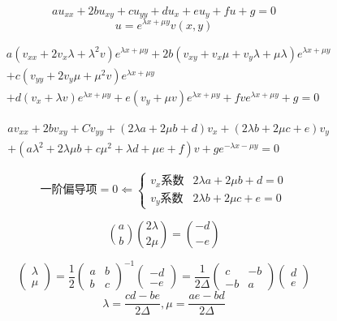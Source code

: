 \begin{ex}[常系数二阶PDE可消去一阶偏导项]

    $$au_{xx}+2bu_{xy}+cu_{yy}+du_{x}+eu_{y}+fu+g=0$$
    $$u=e^{\lambda x+\mu y}v(x,y)$$

    $$\begin{aligned}
        &a(v_{xx}+2v_{x}\lambda+\lambda^{2}v)e^{\lambda x+\mu y}+2b(v_{xy}+v_{x}\mu+v_{y}\lambda+\mu\lambda)e^{\lambda x+\mu y}\\
       &+c(v_{yy}+2v_{y}\mu+\mu^{2}v)e^{\lambda x+\mu y}\\
        &+d(v_{x}+\lambda v)e^{\lambda x+\mu y}+e(v_{y}+\mu v)e^{\lambda x+\mu y}+fve^{\lambda x+\mu y}+g=0
    \end{aligned}$$

    $$\begin{aligned}
        &av_{xx}+2bv_{xy}+Cv_{yy}+(2\lambda a+2\mu b+d)v_{x}+(2\lambda b+2\mu c+e)v_{y}\\
        &+(a\lambda^{2}+2\lambda\mu b+c\mu^{2}+\lambda d+\mu e+f)v+ge^{-\lambda x-\mu y}=0
    \end{aligned}$$

    $$\text{一阶偏导项}=0\Leftarrow
    \begin{cases}
        v_{x}\text{系数}&2\lambda a+2\mu b+d=0\\
        v_{y}\text{系数}&2\lambda b+2\mu c+e=0
    \end{cases}$$

    $$\binom{a}{b}\binom{2\lambda}{2\mu}=\binom{-d}{-e}$$

    $$\begin{pmatrix}\lambda\\\mu\end{pmatrix}
    =\frac{1}{2}\begin{pmatrix}a&b\\b&c\end{pmatrix}^{-1}\begin{pmatrix}-d\\-e\end{pmatrix}
    =\frac{1}{2\Delta}\begin{pmatrix}c&-b\\-b&a\end{pmatrix}\begin{pmatrix}d\\e\end{pmatrix}$$
    $$\lambda=\frac{cd-be}{2\Delta},\mu=\frac{ae-bd}{2\Delta}$$
\end{ex}
